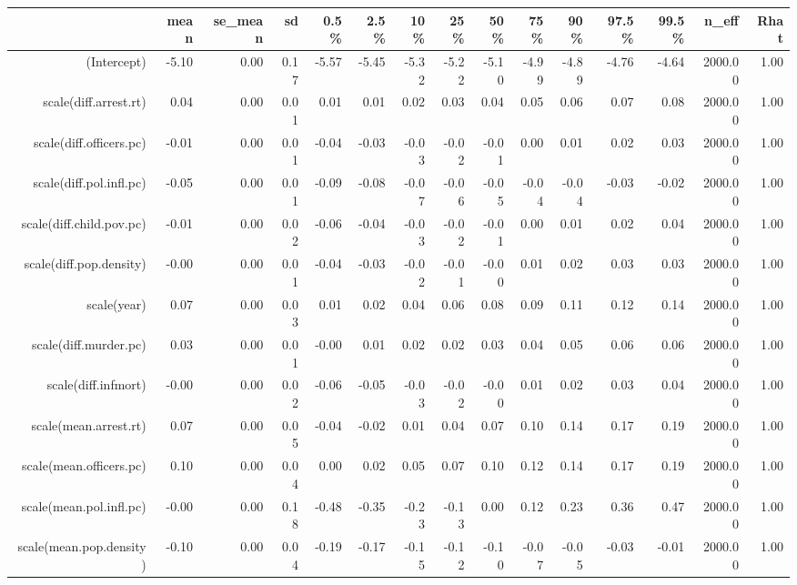 \begin{table}[ht]
\centering
\begin{tabular}{rrrrrrrrrrrrrrr}
  \hline
 & mean & se\_mean & sd & 0.5\% & 2.5\% & 10\% & 25\% & 50\% & 75\% & 90\% & 97.5\% & 99.5\% & n\_eff & Rhat \\ 
  \hline
(Intercept) & -5.10 & 0.00 & 0.17 & -5.57 & -5.45 & -5.32 & -5.22 & -5.10 & -4.99 & -4.89 & -4.76 & -4.64 & 2000.00 & 1.00 \\ 
  scale(diff.arrest.rt) & 0.04 & 0.00 & 0.01 & 0.01 & 0.01 & 0.02 & 0.03 & 0.04 & 0.05 & 0.06 & 0.07 & 0.08 & 2000.00 & 1.00 \\ 
  scale(diff.officers.pc) & -0.01 & 0.00 & 0.01 & -0.04 & -0.03 & -0.03 & -0.02 & -0.01 & 0.00 & 0.01 & 0.02 & 0.03 & 2000.00 & 1.00 \\ 
  scale(diff.pol.infl.pc) & -0.05 & 0.00 & 0.01 & -0.09 & -0.08 & -0.07 & -0.06 & -0.05 & -0.04 & -0.04 & -0.03 & -0.02 & 2000.00 & 1.00 \\ 
  scale(diff.child.pov.pc) & -0.01 & 0.00 & 0.02 & -0.06 & -0.04 & -0.03 & -0.02 & -0.01 & 0.00 & 0.01 & 0.02 & 0.04 & 2000.00 & 1.00 \\ 
  scale(diff.pop.density) & -0.00 & 0.00 & 0.01 & -0.04 & -0.03 & -0.02 & -0.01 & -0.00 & 0.01 & 0.02 & 0.03 & 0.03 & 2000.00 & 1.00 \\ 
  scale(year) & 0.07 & 0.00 & 0.03 & 0.01 & 0.02 & 0.04 & 0.06 & 0.08 & 0.09 & 0.11 & 0.12 & 0.14 & 2000.00 & 1.00 \\ 
  scale(diff.murder.pc) & 0.03 & 0.00 & 0.01 & -0.00 & 0.01 & 0.02 & 0.02 & 0.03 & 0.04 & 0.05 & 0.06 & 0.06 & 2000.00 & 1.00 \\ 
  scale(diff.infmort) & -0.00 & 0.00 & 0.02 & -0.06 & -0.05 & -0.03 & -0.02 & -0.00 & 0.01 & 0.02 & 0.03 & 0.04 & 2000.00 & 1.00 \\ 
  scale(mean.arrest.rt) & 0.07 & 0.00 & 0.05 & -0.04 & -0.02 & 0.01 & 0.04 & 0.07 & 0.10 & 0.14 & 0.17 & 0.19 & 2000.00 & 1.00 \\ 
  scale(mean.officers.pc) & 0.10 & 0.00 & 0.04 & 0.00 & 0.02 & 0.05 & 0.07 & 0.10 & 0.12 & 0.14 & 0.17 & 0.19 & 2000.00 & 1.00 \\ 
  scale(mean.pol.infl.pc) & -0.00 & 0.00 & 0.18 & -0.48 & -0.35 & -0.23 & -0.13 & 0.00 & 0.12 & 0.23 & 0.36 & 0.47 & 2000.00 & 1.00 \\ 
  scale(mean.pop.density) & -0.10 & 0.00 & 0.04 & -0.19 & -0.17 & -0.15 & -0.12 & -0.10 & -0.07 & -0.05 & -0.03 & -0.01 & 2000.00 & 1.00 \\ 

\end{tabular}
\end{table}
